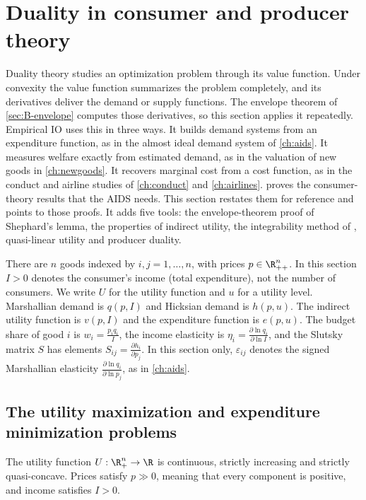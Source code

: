 \section{Duality in consumer and producer theory}\label{sec:B-duality}

Duality theory studies an optimization problem through its value function. Under convexity the value
function summarizes the problem completely, and its derivatives deliver the demand or supply functions. The
envelope theorem of \cref{sec:B-envelope} computes those derivatives, so this section applies it repeatedly.
Empirical IO uses this in three ways. It builds demand systems from an expenditure function, as in the
almost ideal demand system of \cref{ch:aids}. It measures welfare exactly from estimated demand, as in the
valuation of new goods in \cref{ch:newgoods}. It recovers marginal cost from a cost function, as in the
conduct and airline studies of \cref{ch:conduct} and \cref{ch:airlines}.  proves the
consumer-theory results that the AIDS needs. This section restates them for reference and points to those
proofs. It adds five tools: the envelope-theorem proof of Shephard's lemma, the properties of indirect
utility, the integrability method of \citet{Hausman1981}, quasi-linear utility and producer duality.

There are $n$ goods indexed by $i, j = 1, \dots, n$, with prices $p \in \R^n_{++}$. In this section $I > 0$
denotes the consumer's income (total expenditure), not the number of consumers. We write $U$ for the
utility function and $u$ for a utility level. Marshallian demand is $q(p, I)$ and Hicksian demand is
$h(p, u)$. The indirect utility function is $v(p, I)$ and the expenditure function is $e(p, u)$. The budget
share of good $i$ is $w_i = \frac{p_iq_i}{I}$, the income elasticity is
$\eta_i = \frac{\partial\ln q_i}{\partial\ln I}$, and the Slutsky matrix $S$ has elements
$S_{ij} = \frac{\partial h_i}{\partial p_j}$. In this section only, $\varepsilon_{ij}$ denotes the signed
Marshallian elasticity $\frac{\partial\ln q_i}{\partial\ln p_j}$, as in \cref{ch:aids}.

\subsection{The utility maximization and expenditure minimization problems}\label{sec:B-ump-emp}

\begin{assumption}[Preferences]\label{ass:B-preferences}
The utility function $U : \R^n_+ \to \R$ is continuous, strictly increasing and strictly quasi-concave.
Prices satisfy $p \gg 0$, meaning that every component is positive, and income satisfies $I > 0$.
\end{assumption}

